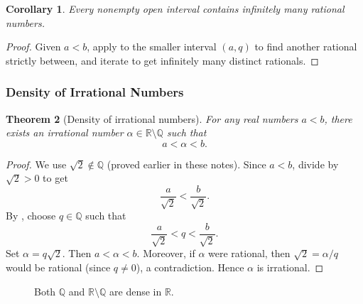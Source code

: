\documentclass[12pt]{article}
\numberwithin{equation}{section}
\newcommand{\RR}{\mathbb{R}}
\newcommand{\QQ}{\mathbb{Q}}
\theoremstyle{plain}
\newtheorem{theorem}{Theorem}[section]
\newtheorem{corollary}[theorem]{Corollary}
\theoremstyle{definition}
\theoremstyle{remark}
\begin{document}
\begin{corollary}\label{cor:many-Q}
Every nonempty open interval contains infinitely many rational numbers.
\end{corollary}

\begin{proof}
Given $a<b$, apply  to the smaller interval $(a,q)$ to find another rational strictly between, and iterate to get infinitely many distinct rationals.
\end{proof}

\subsubsection{Density of Irrational Numbers}

\begin{theorem}[Density of irrational numbers]\label{thm:irr-dense}
For any real numbers $a<b$, there exists an irrational number $\alpha\in\RR\setminus\QQ$ such that
\[
a<\alpha<b.
\]
\end{theorem}

\begin{proof}
We use $\sqrt{2}\notin\QQ$ (proved earlier in these notes).
Since $a<b$, divide by $\sqrt{2}>0$ to get
\[
\frac{a}{\sqrt{2}} < \frac{b}{\sqrt{2}}.
\]
By , choose $q\in\QQ$ such that
\[
\frac{a}{\sqrt{2}} < q < \frac{b}{\sqrt{2}}.
\]
Set $\alpha=q\sqrt{2}$. Then $a<\alpha<b$.
Moreover, if $\alpha$ were rational, then $\sqrt{2}=\alpha/q$ would be rational (since $q\neq 0$), a contradiction. Hence $\alpha$ is irrational.
\end{proof}

\begin{figure}[H]
\centering
{}
\caption{Both $\QQ$ and $\RR\setminus\QQ$ are dense in $\RR$.}
\end{figure}
\end{document}

